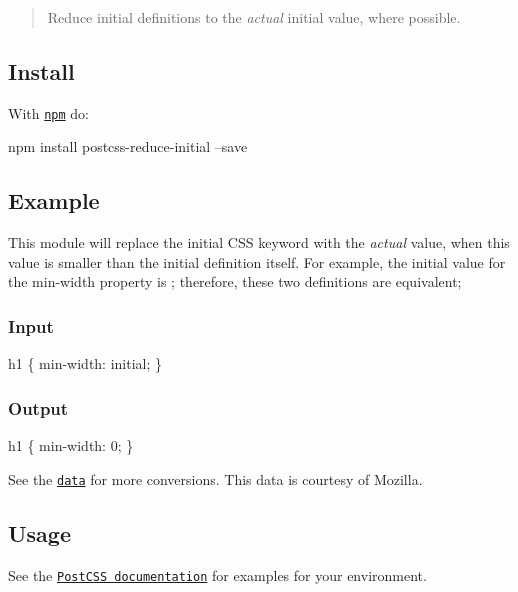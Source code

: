 \begin{quote}
Reduce {\ttfamily initial} definitions to the {\itshape actual} initial value, where possible. \end{quote}


\subsection*{Install}

With \href{https://npmjs.org/package/postcss-reduce-initial}{\tt npm} do\+:


\begin{DoxyCode}
npm install postcss-reduce-initial --save
\end{DoxyCode}


\subsection*{Example}

This module will replace the {\ttfamily initial} C\+SS keyword with the {\itshape actual} value, when this value is smaller than the {\ttfamily initial} definition itself. For example, the initial value for the {\ttfamily min-\/width} property is {}; therefore, these two definitions are equivalent;

\subsubsection*{Input}


\begin{DoxyCode}
h1 \{
    min-width: initial;
\}
\end{DoxyCode}


\subsubsection*{Output}


\begin{DoxyCode}
h1 \{
    min-width: 0;
\}
\end{DoxyCode}


See the \href{data/values.json}{\tt data} for more conversions. This data is courtesy of Mozilla.

\subsection*{Usage}

See the \href{https://github.com/postcss/postcss#usage}{\tt Post\+C\+SS documentation} for examples for your environment.

